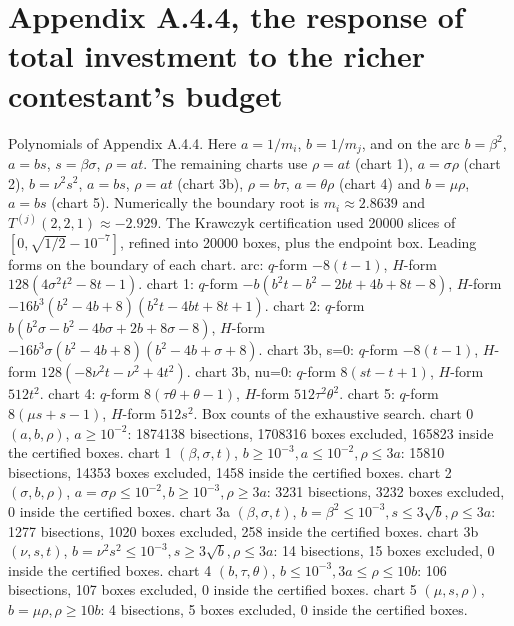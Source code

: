\section*{Appendix A.4.4, the response of total investment to the richer contestant's budget}
Polynomials of Appendix A.4.4. Here $a=1/m_i$, $b=1/m_j$, and on the arc $b=\beta^2$, $a=bs$, $s=\beta\sigma$, $\rho=at$. The remaining charts use $\rho=at$ (chart 1), $a=\sigma\rho$ (chart 2), $b=\nu^2s^2$, $a=bs$, $\rho=at$ (chart 3b), $\rho=b\tau$, $a=\theta\rho$ (chart 4) and $b=\mu\rho$, $a=bs$ (chart 5). Numerically the boundary root is $m_i\approx2.8639$ and $T^{(j)}(2,2,1)\approx-2.929$. The Krawczyk certification used 20000 slices of $[0,\sqrt{1/2}-10^{-7}]$, refined into 20000 boxes, plus the endpoint box. Leading forms on the boundary of each chart. arc: $q$-form $- 8 \left(t - 1\right)$, $H$-form $128 \left(4 \sigma^{2} t^{2} - 8 t - 1\right)$. chart 1: $q$-form $- b \left(b^{2} t - b^{2} - 2 b t + 4 b + 8 t - 8\right)$, $H$-form $- 16 b^{3} \left(b^{2} - 4 b + 8\right) \left(b^{2} t - 4 b t + 8 t + 1\right)$. chart 2: $q$-form $b \left(b^{2} \sigma - b^{2} - 4 b \sigma + 2 b + 8 \sigma - 8\right)$, $H$-form $- 16 b^{3} \sigma \left(b^{2} - 4 b + 8\right) \left(b^{2} - 4 b + \sigma + 8\right)$. chart 3b, s=0: $q$-form $- 8 \left(t - 1\right)$, $H$-form $128 \left(- 8 \nu^{2} t - \nu^{2} + 4 t^{2}\right)$. chart 3b, nu=0: $q$-form $8 \left(s t - t + 1\right)$, $H$-form $512 t^{2}$. chart 4: $q$-form $8 \left(\tau \theta + \theta - 1\right)$, $H$-form $512 \tau^{2} \theta^{2}$. chart 5: $q$-form $8 \left(\mu s + s - 1\right)$, $H$-form $512 s^{2}$. Box counts of the exhaustive search. chart 0 $(a,b,\rho)$, $a \ge 10^{-2}$: 1874138 bisections, 1708316 boxes excluded, 165823 inside the certified boxes. chart 1 $(\beta,\sigma,t)$, $b \ge 10^{-3}, a \le 10^{-2}, \rho \le 3a$: 15810 bisections, 14353 boxes excluded, 1458 inside the certified boxes. chart 2 $(\sigma,b,\rho)$, $a = \sigma \rho \le 10^{-2}, b \ge 10^{-3}, \rho \ge 3a$: 3231 bisections, 3232 boxes excluded, 0 inside the certified boxes. chart 3a $(\beta,\sigma,t)$, $b = \beta^2 \le 10^{-3}, s \le 3 \sqrt b, \rho \le 3a$: 1277 bisections, 1020 boxes excluded, 258 inside the certified boxes. chart 3b $(\nu,s,t)$, $b = \nu^2 s^2 \le 10^{-3}, s \ge 3 \sqrt b, \rho \le 3a$: 14 bisections, 15 boxes excluded, 0 inside the certified boxes. chart 4 $(b,\tau,\theta)$, $b \le 10^{-3}, 3a \le \rho \le 10b$: 106 bisections, 107 boxes excluded, 0 inside the certified boxes. chart 5 $(\mu,s,\rho)$, $b = \mu \rho, \rho \ge 10b$: 4 bisections, 5 boxes excluded, 0 inside the certified boxes.

